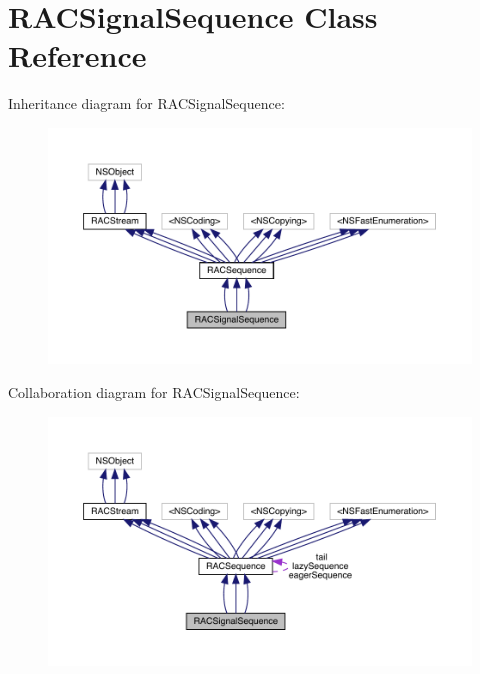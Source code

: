 \hypertarget{interface_r_a_c_signal_sequence}{}\section{R\+A\+C\+Signal\+Sequence Class Reference}
\label{interface_r_a_c_signal_sequence}


Inheritance diagram for R\+A\+C\+Signal\+Sequence\+:\nopagebreak
\begin{figure}[H]
\begin{center}
\leavevmode
\includegraphics[width=350pt]{interface_r_a_c_signal_sequence__inherit__graph}
\end{center}
\end{figure}


Collaboration diagram for R\+A\+C\+Signal\+Sequence\+:\nopagebreak
\begin{figure}[H]
\begin{center}
\leavevmode
\includegraphics[width=350pt]{interface_r_a_c_signal_sequence__coll__graph}
\end{center}
\end{figure}
